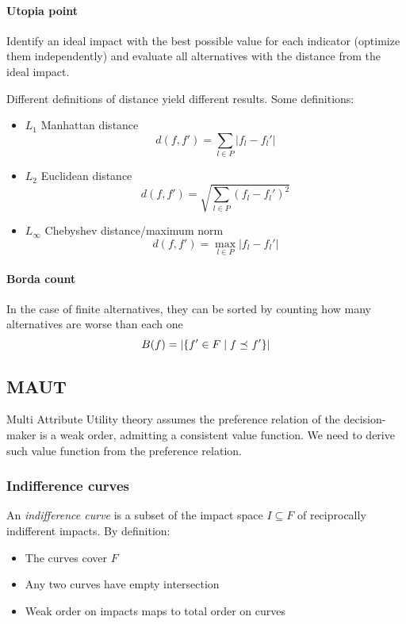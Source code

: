 \paragraph{Utopia point} Identify an ideal impact with the best possible value for each indicator (optimize them independently) and evaluate all alternatives with the distance from the ideal impact. 

Different definitions of distance yield different results. Some definitions:
\begin{itemize}
	\item $L_1$ Manhattan distance
	$$ d(f, f') = \sum_{l \in P} |f_l - f_l'|$$
	
	\item $L_2$ Euclidean distance
	$$ d(f, f') = \sqrt{\sum_{l \in P} \left(f_l - f_l'\right)^2} $$
	
	\item $L_\infty$ Chebyshev distance/maximum norm
	$$ d(f,f') = \max_{l \in P} |f_l - f_l'| $$
\end{itemize}

\paragraph{Borda count} In the case of finite alternatives, they can be sorted by counting how many alternatives are worse than each one
$$ B(f) = \left|\left\{f' \in F \mid f \preceq_{} f' \right\}\right| $$

\subsection{MAUT}

Multi Attribute Utility theory assumes the preference relation of the decision-maker is a weak order, admitting a consistent value function. We need to derive such value function from the preference relation.

\subsubsection{Indifference curves}

An \textit{indifference curve} is a subset of the impact space $I \subseteq F$ of reciprocally indifferent impacts. By definition: 
\begin{itemize}
	\item The curves cover $F$
	
	\item Any two curves have empty intersection
	
	\item Weak order on impacts maps to total order on curves
\end{itemize}

